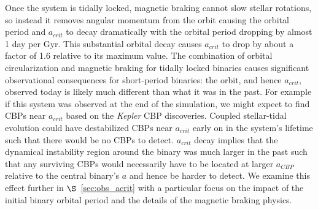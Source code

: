 Once the system is tidally locked, magnetic braking cannot slow stellar rotations, so instead it removes angular momentum from the orbit causing the orbital period and $a_{crit}$ to decay dramatically with the orbital period dropping by almost 1 day per Gyr.  This substantial orbital decay causes $a_{crit}$ to drop by about a factor of 1.6 relative to its maximum value.  The combination of orbital circularization and magnetic braking for tidally locked binaries causes significant observational consequences for short-period binaries: the orbit, and hence $a_{crit}$, observed today is likely much different than what it was in the past.  For example if this system was observed at the end of the simulation, we might expect to find CBPs near $a_{crit}$ based on the {\it Kepler} CBP discoveries.  Coupled stellar-tidal evolution could have destabilized CBPs near $a_{crit}$ early on in the system's lifetime such that there would be no CBPs to detect.  $a_{crit}$ decay implies that the dynamical instability region around the binary was much larger in the past such that any surviving CBPs would necessarily have to be located at larger $a_{CBP}$ relative to the central binary's $a$ and hence be harder to detect.  We examine this effect further in $\S$~\ref{sec:obs_acrit} with a particular focus on the impact of the initial binary orbital period and the details of the magnetic braking physics.

